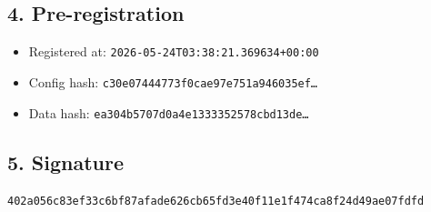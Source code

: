 \documentclass{article}
\begin{document}
\subsection*{4. Pre-registration}
\begin{itemize}
\item Registered at: \texttt{2026-05-24T03:38:21.369634+00:00}
\item Config hash: \texttt{c30e07444773f0cae97e751a946035ef\dots}
\item Data hash: \texttt{ea304b5707d0a4e1333352578cbd13de\dots}
\end{itemize}
\subsection*{5. Signature}
\texttt{402a056c83ef33c6bf87afade626cb65fd3e40f11e1f474ca8f24d49ae07fdfd}\\
\end{document}
